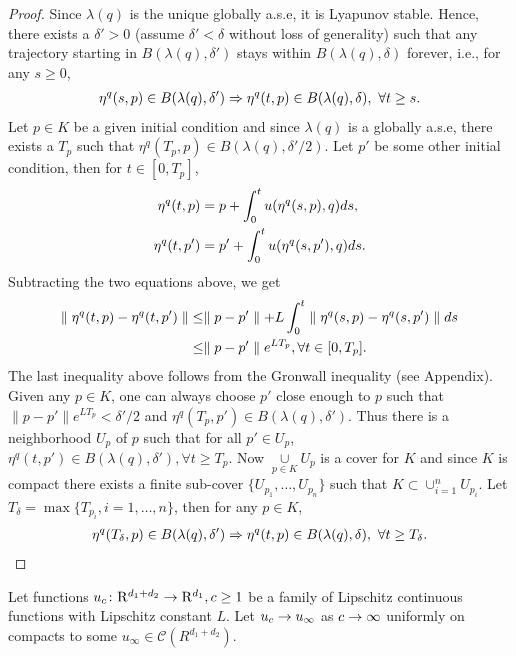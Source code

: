 \begin{proof}
Since $\lambda(q)$ is the unique globally a.s.e, it is Lyapunov stable. Hence, there exists a 
$\delta'>0$ (assume $\delta'<\delta$ without loss of generality) such that any trajectory starting 
in $B(\lambda(q),\delta')$ stays within $B(\lambda(q),\delta)$ forever, i.e., for any $s\geq 0$,
\begin{align}
\eta^q(s,p)\in B(\lambda(q),\delta') \Rightarrow \eta^q(t,p) \in B(\lambda(q),\delta), \mbox{ } \forall t \geq s.
\end{align}
Let $p \in K$ be a given initial condition and since $\lambda(q)$ is a globally a.s.e, there exists a 
$T_{p}$ such that $\eta^q(T_p,p)\in B(\lambda(q),\delta'/2)$. Let $p'$ be some other initial condition, 
then for $t \in [0,T_p]$,
\begin{align}
\eta^q(t,p)&=p+\int_0^t u(\eta^q(s,p),q)ds,\nonumber\\
\eta^q(t,p')&=p'+\int_0^t u(\eta^q(s,p'),q)ds.\nonumber
\end{align}
Subtracting the two equations above, we get
\begin{align}
\parallel \eta^q(t,p)-\eta^q(t,p')\parallel &\leq \parallel p-p'\parallel +L\int_0^t \parallel
\eta^q(s,p)-\eta^q(s,p')\parallel ds\nonumber\\
&\leq \parallel p-p'\parallel e^{LT_p}, \forall t \in [0,T_p].
\end{align}
The last inequality above follows from the Gronwall inequality (see Appendix). Given any $p\in K$, one can always choose $p'$ close enough to $p$ such that $\parallel p-p'\parallel e^{LT_p}<\delta'/2$ and 
$\eta^q(T_p,p') \in B(\lambda(q),\delta')$. Thus there is a neighborhood $U_p$ of $p$ such that for all $p' \in U_p$, $\eta^q(t,p') \in B(\lambda(q),\delta'), \forall t\geq T_p$. Now $\underset{p\in K}{\cup} U_p$ is a cover for $K$ and since $K$ is compact there exists a finite sub-cover $\{U_{p_1}, \ldots,U_{p_n}\}$ such that $K \subset \cup_{i=1}^nU_{p_i}$. 
Let $T_\delta=\max\{T_{p_i}, i=1,\ldots,n\}$, then for any $p
\in K$,
\begin{align}
\eta^q(T_\delta,p)\in B(\lambda(q),\delta') \Rightarrow \eta^q(t,p) \in B(\lambda(q),\delta), \mbox{ } \forall t \geq T_\delta.
\end{align}
\end{proof}
\begin{assumption}\label{scalefns}
Let functions $u_c \colon \mathrm{R}^{d_1+d_2} \rightarrow \mathrm{R}^{d_1}, c\geq 1$ be a family of Lipschitz continuous functions 
with Lipschitz constant $L$. Let $u_c \rightarrow u_\infty$ as $c \rightarrow \infty$ uniformly on compacts to some 
$u_\infty \in \mathcal{C}(R^{d_1+d_2})$.
\end{assumption}
